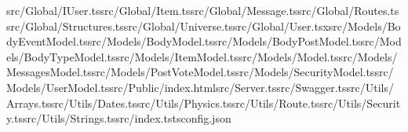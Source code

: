 \documentclass[a4paper,12pt]{article}
\begin{document}
src/Global/IUser.ts\newline src/Global/Item.ts\newline src/Global/Message.ts\newline src/Global/Routes.ts\newline src/Global/Structures.ts\newline src/Global/Universe.ts\newline src/Global/User.tsx\newline src/Models/BodyEventModel.ts\newline src/Models/BodyModel.ts\newline src/Models/BodyPostModel.ts\newline src/Models/BodyTypeModel.ts\newline src/Models/ItemModel.ts\newline src/Models/Model.ts\newline src/Models/MessagesModel.ts\newline src/Models/PostVoteModel.ts\newline src/Models/SecurityModel.ts\newline src/Models/UserModel.ts\newline src/Public/index.html\newline src/Server.ts\newline src/Swagger.ts\newline src/Utils/Arrays.ts\newline src/Utils/Dates.ts\newline src/Utils/Physics.ts\newline src/Utils/Route.ts\newline src/Utils/Security.ts\newline src/Utils/Strings.ts\newline src/index.ts\newline tsconfig.json\newline


\end{document}
